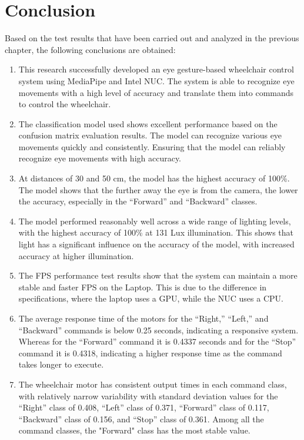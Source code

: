 \section{Conclusion}
\label{sec:conclusion}


Based on the test results that have been carried out and analyzed in the previous chapter, the following conclusions are obtained:

\begin{enumerate}

  \item This research successfully developed an eye gesture-based wheelchair control system using MediaPipe and Intel NUC. The system is able to recognize eye movements with a high level of accuracy and translate them into commands to control the wheelchair.

  \item The classification model used shows excellent performance based on the confusion matrix evaluation results. The model can recognize various eye movements quickly and consistently. Ensuring that the model can reliably recognize eye movements with high accuracy.

  \item At distances of 30 and 50 cm, the model has the highest accuracy of 100\%. The model shows that the further away the eye is from the camera, the lower the accuracy, especially in the “Forward” and “Backward” classes.

  \item The model performed reasonably well across a wide range of lighting levels, with the highest accuracy of 100\% at 131 Lux illumination. This shows that light has a significant influence on the accuracy of the model, with increased accuracy at higher illumination. 

  \item The FPS performance test results show that the system can maintain a more stable and faster FPS on the Laptop. This is due to the difference in specifications, where the laptop uses a GPU, while the NUC uses a CPU.
  
  \item The average response time of the motors for the “Right,” “Left,” and “Backward” commands is below 0.25 seconds, indicating a responsive system. Whereas for the “Forward” command it is 0.4337 seconds and for the “Stop” command it is 0.4318, indicating a higher response time as the command takes longer to execute.
  
  \item The wheelchair motor has consistent output times in each command class, with relatively narrow variability with standard deviation values for the “Right” class of 0.408, “Left” class of 0.371, “Forward” class of 0.117, “Backward” class of 0.156, and “Stop” class of 0.361. Among all the command classes, the "Forward" class has the most stable value.

\end{enumerate}